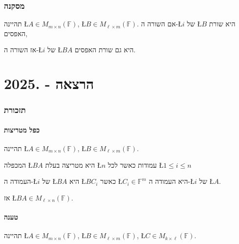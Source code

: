 \documentclass[english,hebrew]{article}
\begin{document}
\section{מסקנה}

תהיינה \L{$A\in M_{m\times n}(\mathbb{F})$}, \L{$B\in M_{\ell\times m}(\mathbb{F})$}.
אם השורה ה-\L{$i$} של \L{$B$} היא שורת האפסים,

אז השורה ה-\L{$i$} של \L{$BA$} היא גם שורת האפסים. 

\newpage{}

\noindent{}

\part{הרצאה {\endL} - {.2025\endL}}

\section{תזכורת}

\subsection{כפל מטריצות}

תהיינה \L{$A\in M_{m\times n}(\mathbb{F})$}, \L{$B\in M_{\ell\times m}(\mathbb{F})$}.

המכפלה \L{$BA$} היא מטריצה בעלת \L{$n$} עמודות כאשר לכל \L{$1\leq i\leq n$}

העמודה ה-\L{$i$} של \L{$BA$} היא \L{$BC_{i}$} כאשר \L{$C_{i}\in\mathbb{F}^{m}$}
היא העמודה ה-\L{$i$} של \L{$A$}.

אז \L{$BA\in M_{\ell\times n}(\mathbb{F})$}.

\subsection{טענה}

תהיינה \L{$A\in M_{m\times n}(\mathbb{F})$}, \L{$B\in M_{\ell\times m}(\mathbb{F})$},
\L{$C\in M_{k\times\ell}(\mathbb{F})$}.
\end{document}
